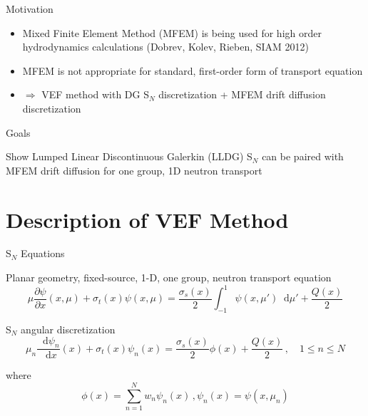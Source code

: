 \documentclass[10pt]{beamer}
\newcommand{\SN}{S$_N$\xspace}
\newcommand{\ud}{\mathop{}\!\mathrm{d}} %
\newcommand{\pderiv}[2]{\frac{\partial #1}{\partial #2}}
\newcommand{\dderiv}[2]{\frac{\ud #1}{\ud #2}}
\newcommand{\paren}[1]{\left(#1\right)}
\begin{document}
\begin{frame}{Motivation}

	\begin{itemize}

		\item Mixed Finite Element Method (MFEM) is being used for high order hydrodynamics calculations (Dobrev, Kolev, Rieben, SIAM 2012)

		\item MFEM is not appropriate for standard, first-order form of transport equation 

		\item $\Rightarrow$ VEF method with DG \SN discretization + MFEM drift diffusion discretization 

	\end{itemize}

	\begin{alertblock}{Goals}
		
		Show Lumped Linear Discontinuous Galerkin (LLDG) \SN can be paired with MFEM drift diffusion for one group, 1D neutron transport 

	\end{alertblock}

\end{frame}

\section{Description of VEF Method}

\begin{frame}{\SN Equations}

	Planar geometry, fixed-source, 1-D, one group, neutron transport equation 
	\begin{equation*} 
		\mu \pderiv{\psi}{x} \paren{x, \mu} + \sigma_t(x) \psi(x,\mu) = 
			\frac{\sigma_s(x)}{2} \int_{-1}^1 \psi(x,\mu') \ud \mu' + \frac{Q(x)}{2}
	\end{equation*}

	\pause
	\SN angular discretization 
	\begin{equation*} \label{eq:sn}
		\mu_n \dderiv{\psi_n}{x}(x) + \sigma_t(x) \psi_n(x) = 
		\frac{\sigma_s(x)}{2} \phi(x) + \frac{Q(x)}{2} \,, \quad 1 \leq n \leq N
	\end{equation*}

	where 
	\begin{equation*}
		\phi(x) = \sum_{n=1}^N w_n \psi_n(x) \,, \psi_n(x) = \psi(x, \mu_n)
	\end{equation*}

\end{frame}
\end{document}
